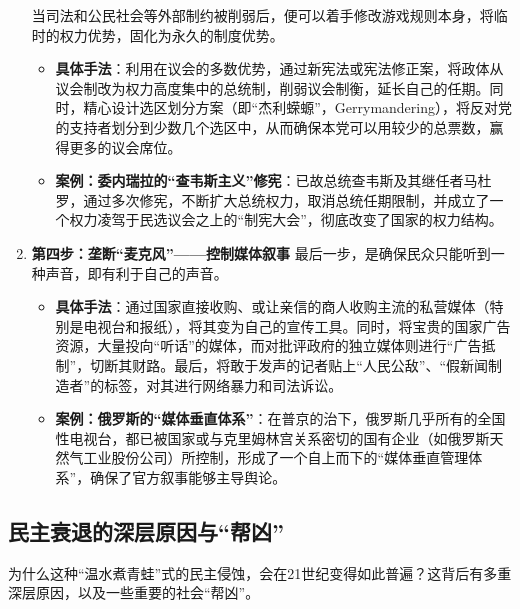 \begin{enumerate}
    当司法和公民社会等外部制约被削弱后，便可以着手修改游戏规则本身，将临时的权力优势，固化为永久的制度优势。
    \begin{itemize}
        \item \textbf{具体手法}：利用在议会的多数优势，通过新宪法或宪法修正案，将政体从议会制改为权力高度集中的总统制，削弱议会制衡，延长自己的任期。同时，精心设计选区划分方案（即“杰利蝾螈”，Gerrymandering），将反对党的支持者划分到少数几个选区中，从而确保本党可以用较少的总票数，赢得更多的议会席位。
        \item \textbf{案例：委内瑞拉的“查韦斯主义”修宪}：已故总统查韦斯及其继任者马杜罗，通过多次修宪，不断扩大总统权力，取消总统任期限制，并成立了一个权力凌驾于民选议会之上的“制宪大会”，彻底改变了国家的权力结构。
    \end{itemize}
    \item \textbf{第四步：垄断“麦克风”——控制媒体叙事}
    最后一步，是确保民众只能听到一种声音，即有利于自己的声音。
    \begin{itemize}
        \item \textbf{具体手法}：通过国家直接收购、或让亲信的商人收购主流的私营媒体（特别是电视台和报纸），将其变为自己的宣传工具。同时，将宝贵的国家广告资源，大量投向“听话”的媒体，而对批评政府的独立媒体则进行“广告抵制”，切断其财路。最后，将敢于发声的记者贴上“人民公敌”、“假新闻制造者”的标签，对其进行网络暴力和司法诉讼。
        \item \textbf{案例：俄罗斯的“媒体垂直体系”}：在普京的治下，俄罗斯几乎所有的全国性电视台，都已被国家或与克里姆林宫关系密切的国有企业（如俄罗斯天然气工业股份公司）所控制，形成了一个自上而下的“媒体垂直管理体系”，确保了官方叙事能够主导舆论。
    \end{itemize}
\end{enumerate}

\subsection{民主衰退的深层原因与“帮凶”}

为什么这种“温水煮青蛙”式的民主侵蚀，会在21世纪变得如此普遍？这背后有多重深层原因，以及一些重要的社会“帮凶”。

